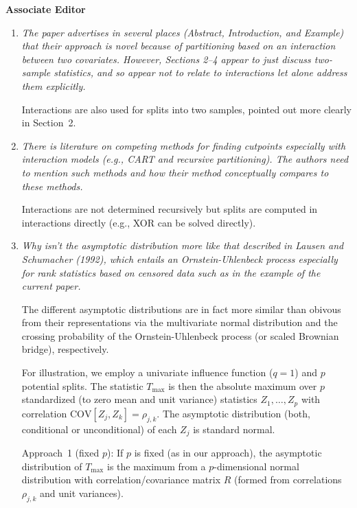 \documentclass[11pt,a4paper]{article}
\begin{document}
\textbf{\large Associate Editor}

\begin{enumerate}

  \item \textit{The paper advertises in several places (Abstract,
        Introduction, and Example) that their approach is novel because
	of partitioning based on an interaction between two covariates.
	However, Sections 2--4 appear to just discuss two-sample statistics,
	and so appear not to relate to interactions let alone address them
	explicitly.}
	
	Interactions are also used for splits into two samples, pointed
	out more clearly in Section~2.
	
  \item \textit{There is literature on competing methods for finding cutpoints
        especially with interaction models (e.g., CART and recursive partitioning).
	The authors need to mention such methods and how their method conceptually
	compares to these methods.}
	
	Interactions are not determined recursively but splits are computed in
	interactions directly (e.g., XOR can be solved directly).

  \item \textit{Why isn't the asymptotic distribution more like that described
        in Lausen and Schumacher (1992), which entails an Ornstein-Uhlenbeck process
	especially for rank statistics based on censored data such as in the example
	of the current paper.}
	
        The different asymptotic distributions are in fact more similar than obivous
	from their representations via the multivariate normal distribution and the
	crossing probability of the Ornstein-Uhlenbeck process (or scaled Brownian
	bridge), respectively. 
	
	For illustration, we employ a univariate influence function ($q = 1$) and
	$p$ potential splits. The statistic $T_{\max}$ is then the absolute maximum over
	$p$ standardized (to zero mean and unit variance) statistics $Z_1, \dots, Z_p$
	with correlation $\mbox{COV}[Z_j, Z_k] = \rho_{j, k}$. The asymptotic distribution
	(both, conditional or unconditional) of each $Z_j$ is standard normal.
	
	Approach~1 (fixed $p$): If $p$ is fixed (as in our approach), the asymptotic
	distribution of $T_{\max}$ is the maximum from a $p$-dimensional normal
	distribution with correlation/covariance matrix $R$ (formed from correlations
	$\rho_{j, k}$ and unit variances).
	

\end{enumerate}
\end{document}
